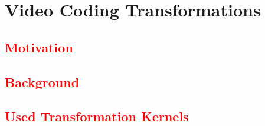 \cleardoublepage
{}
\chapter{Video Coding Transformations}

\section{\textcolor{red}{Motivation}}

\section{\textcolor{red}{Background}}

\section{\textcolor{red}{Used Transformation Kernels}}
